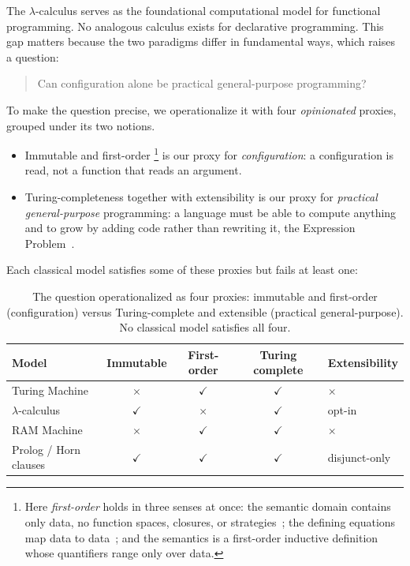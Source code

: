 The $\lambda$-calculus serves as the foundational computational model for
functional programming. No analogous calculus exists for declarative
programming. This gap matters because the two paradigms differ in
fundamental ways, which raises a question:

\begin{quote}
  Can configuration alone be practical general-purpose programming?
\end{quote}

\noindent
To make the question precise, we operationalize it with four
\emph{opinionated} proxies, grouped under its two notions.

\begin{itemize}
  \item Immutable and first-order%
    \footnote{
      Here \emph{first-order} holds in three senses at once:
      the semantic domain contains only data, no function spaces,
      closures, or
      strategies~\cite{vanemden1976-predicate-logic-semantics};
      the defining equations map data to
      data~\cite{reynolds1972-definitional-interpreters};
      and the semantics is a first-order inductive
      definition~\cite{aczel1977-inductive-definitions} whose
      quantifiers range only over data.
    }
    is our proxy for
    \emph{configuration}: a configuration is read, not a function that
    reads an argument.
  \item Turing-completeness together with extensibility is our proxy for
    \emph{practical general-purpose} programming: a language must be able
    to compute anything and to grow by adding code rather than rewriting
    it, the Expression
    Problem~\cite{wadler1998-expression-problem}.
\end{itemize}

\noindent
Each classical model satisfies some of these proxies but fails at least
one:

\begin{table}[h]
  \centering
  \small
  \begin{tabular}{lcccl}
    \textbf{Model} & \textbf{Immutable} & \textbf{First-order} & \textbf{Turing complete} & \textbf{Extensibility} \\
    \hline
    Turing Machine        & $\times$     & $\checkmark$ & $\checkmark$ & $\times$ \\
    $\lambda$-calculus    & $\checkmark$ & $\times$     & $\checkmark$ & opt-in \\
    RAM Machine           & $\times$     & $\checkmark$ & $\checkmark$ & $\times$ \\
    Prolog / Horn clauses & $\checkmark$ & $\checkmark$ & $\checkmark$ & disjunct-only \\
  \end{tabular}
  \caption{The question operationalized as four proxies: immutable and
    first-order (configuration) versus Turing-complete and extensible
  (practical general-purpose). No classical model satisfies all four.}
  \label{tab:computational-models}
\end{table}


